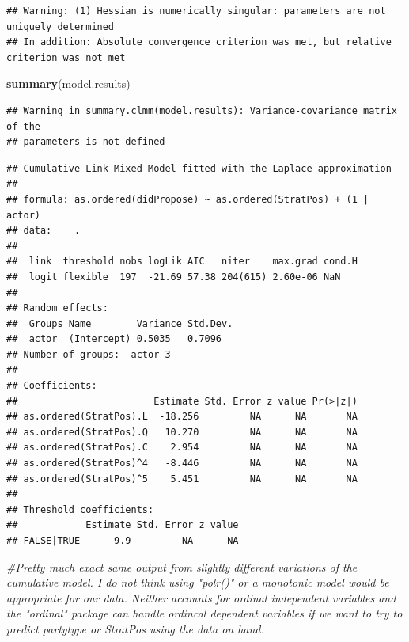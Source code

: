 \documentclass[
]{article}
\newenvironment{Shaded}{\begin{snugshade}}{\end{snugshade}}
\newcommand{\CommentTok}[1]{\textcolor[rgb]{0.56,0.35,0.01}{\textit{#1}}}
\newcommand{\KeywordTok}[1]{\textcolor[rgb]{0.13,0.29,0.53}{\textbf{#1}}}
\newcommand{\NormalTok}[1]{#1}
\begin{document}
\begin{verbatim}
## Warning: (1) Hessian is numerically singular: parameters are not uniquely determined 
## In addition: Absolute convergence criterion was met, but relative criterion was not met
\end{verbatim}

\begin{Shaded}
\begin{Highlighting}[]
\KeywordTok{summary}\NormalTok{(model.results)}
\end{Highlighting}
\end{Shaded}

\begin{verbatim}
## Warning in summary.clmm(model.results): Variance-covariance matrix of the
## parameters is not defined
\end{verbatim}

\begin{verbatim}
## Cumulative Link Mixed Model fitted with the Laplace approximation
## 
## formula: as.ordered(didPropose) ~ as.ordered(StratPos) + (1 | actor)
## data:    .
## 
##  link  threshold nobs logLik AIC   niter    max.grad cond.H
##  logit flexible  197  -21.69 57.38 204(615) 2.60e-06 NaN   
## 
## Random effects:
##  Groups Name        Variance Std.Dev.
##  actor  (Intercept) 0.5035   0.7096  
## Number of groups:  actor 3 
## 
## Coefficients:
##                        Estimate Std. Error z value Pr(>|z|)
## as.ordered(StratPos).L  -18.256         NA      NA       NA
## as.ordered(StratPos).Q   10.270         NA      NA       NA
## as.ordered(StratPos).C    2.954         NA      NA       NA
## as.ordered(StratPos)^4   -8.446         NA      NA       NA
## as.ordered(StratPos)^5    5.451         NA      NA       NA
## 
## Threshold coefficients:
##            Estimate Std. Error z value
## FALSE|TRUE     -9.9         NA      NA
\end{verbatim}

\begin{Shaded}
\begin{Highlighting}[]
\CommentTok{#Pretty much exact same output from slightly different variations of the cumulative model. I do not think using "polr()" or a monotonic model would be appropriate for our data. Neither accounts for ordinal independent variables and the "ordinal" package can handle ordincal dependent variables if we want to try to predict partytype or StratPos using the data on hand.}
\end{Highlighting}
\end{Shaded}
\end{document}
